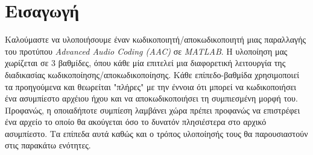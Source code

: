 \section*{Εισαγωγή}

Καλούμαστε να υλοποιήσουμε έναν κωδικοποιητή/αποκωδικοποιητή μιας παραλλαγής του προτύπου \emph{Advanced Audio Coding (AAC)} σε
\emph{MATLAB}. Η υλοποίηση μας χωρίζεται σε 3 βαθμίδες, όπου κάθε μία επιτελεί μια διαφορετική λειτουργία της διαδικασίας
κωδικοποίησης/αποκωδικοποίησης. Κάθε επίπεδο-βαθμίδα χρησιμοποιεί τα προηγούμενα και θεωρείται "πλήρες" με την έννοια ότι μπορεί να
κωδικοποιήσει ένα ασυμπίεστο αρχέιου ήχου και να αποκωδικοποιήσει τη συμπιεσμένη μορφή του. Προφανώς, η οποιαδήποτε συμπίεση λαμβάνει χώρα
πρέπει προφανώς να επιστρέφει ένα αρχείο το οποίο θα ακούγεται όσο το δυνατόν πλησιέστερα στο αρχικό ασυμπίεστο. Τα επίπεδα αυτά καθώς και
ο τρόπος υλοποίησής τους θα παρουσιαστούν στις παρακάτω ενότητες.
